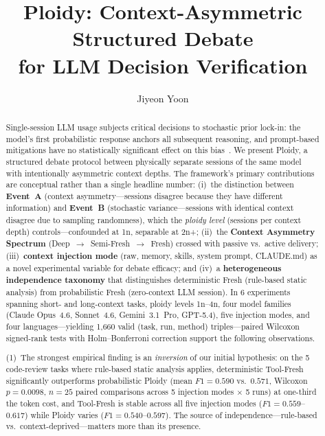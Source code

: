 \documentclass[11pt]{article}
\title{Ploidy: Context-Asymmetric Structured Debate\\for LLM Decision Verification}
\author{Jiyeon Yoon}
\date{}
\begin{document}
\maketitle

\begin{abstract}
Single-session LLM usage subjects critical decisions to stochastic prior lock-in: the model's first probabilistic response anchors all subsequent reasoning, and prompt-based mitigations have no statistically significant effect on this bias~\citep{feng2026anchoring}. We present Ploidy, a structured debate protocol between physically separate sessions of the same model with intentionally asymmetric context depths. The framework's primary contributions are conceptual rather than a single headline number: (i)~the distinction between \textbf{Event~A} (context asymmetry---sessions disagree because they have different information) and \textbf{Event~B} (stochastic variance---sessions with identical context disagree due to sampling randomness), which the \emph{ploidy level} (sessions per context depth) controls---confounded at 1n, separable at 2n+; (ii)~the \textbf{Context Asymmetry Spectrum} (Deep~$\to$~Semi-Fresh~$\to$~Fresh) crossed with passive vs.\ active delivery; (iii)~\textbf{context injection mode} (raw, memory, skills, system prompt, CLAUDE.md) as a novel experimental variable for debate efficacy; and (iv)~a \textbf{heterogeneous independence taxonomy} that distinguishes deterministic Fresh (rule-based static analysis) from probabilistic Fresh (zero-context LLM session). In 6 experiments spanning short- and long-context tasks, ploidy levels 1n--4n, four model families (Claude Opus~4.6, Sonnet~4.6, Gemini~3.1~Pro, GPT-5.4), five injection modes, and four languages---yielding 1{,}660 valid (task, run, method) triples---paired Wilcoxon signed-rank tests with Holm--Bonferroni correction support the following observations.

\noindent (1)~The strongest empirical finding is an \emph{inversion} of our initial hypothesis: on the 5 code-review tasks where rule-based static analysis applies, deterministic Tool-Fresh significantly outperforms probabilistic Ploidy (mean $F1 = 0.590$ vs.\ $0.571$, Wilcoxon $p = 0.0098$, $n = 25$ paired comparisons across 5 injection modes $\times$ 5 runs) at one-third the token cost, and Tool-Fresh is stable across all five injection modes ($F1 = 0.559$--$0.617$) while Ploidy varies ($F1 = 0.540$--$0.597$). The source of independence---rule-based vs.\ context-deprived---matters more than its presence.


\end{abstract}
\end{document}
